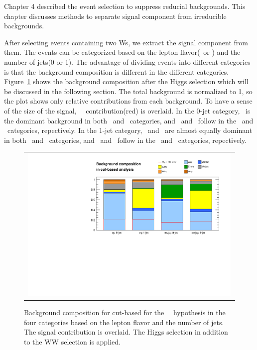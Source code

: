 Chapter 4 described the event selection to suppress reducial backgrounds. 
This chapter discusses methods to separate signal component from 
irreducible backgrounds. 

After selecting events containing two Ws, we extract the signal component 
from them. The events can be categorized based on the lepton flavor(\DF\ or \SF)
and the number of jets(0 or 1). The advantage of dividing events 
into different categories is that the background composition is different
in the different categories. 
Figure~\ref{fig:bkgcomposition} shows the background composition
after the Higgs selection which will be discussed in the following section.
The total background is normalized to 1, so the plot shows only relative 
contributions from each background. To have a sense of the size of the signal, 
~\GeV\ contribution(red) is overlaid. 
In the 0-jet category, \ww\ is the dominant background in both \DF\ and \SF\ 
categories, and \Wjets\ and \dyll\ follow in the \DF\ and \SF\ categories,
repectively. 
In the 1-jet category, \ww\ and \topbkg\ are almost equally dominant in both \DF\ and \SF\
categories, and \Wjets\ and \dyll\ follow in the \DF\ and \SF\ categories,
repectively.
%
\begin{figure}[htp] 
\centering 
\begin{tabular}{c} 
\includegraphics[width=0.99\textwidth]{figures/Bkgcomposition_cutbased.pdf} 
\end{tabular} 
\caption{Background composition for cut-based for the ~\GeV\ hypothesis
in the four categories based on the lepton flavor and the number of jets. 
The signal contribution is overlaid. The Higgs selection in addition to the  
WW selection is applied.  
} 
\label{fig:bkgcomposition} 
\end{figure} 

